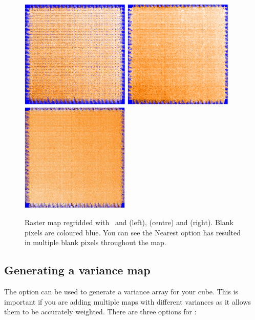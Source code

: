 \documentclass[11pt,oneside,chapters]{starlink}
\begin{document}
\begin{figure}[h!]
\begin{center}
\includegraphics[width=5.2cm, height=5.2cm]{sc20_nearest}
\includegraphics[width=5.2cm, height=5.2cm]{sc20_gauss}
\includegraphics[width=5.2cm, height=5.2cm]{sc20_sincsinc}
\caption[Options for the \makecube\ parameter `spread']{\label{fig:spread}
  Raster map regridded with \makecube\ and 
  (left),  (centre) and  (right). Blank
  pixels are coloured blue. You can see the Nearest option has
  resulted in multiple blank pixels throughout the map.}
\end{center}
\end{figure}


\subsection{Generating a variance map}

The option  can be used to generate a variance array for
your cube. This is important if you are adding multiple maps with
different variances as it allows them to be accurately weighted. There
are three options for :
\end{document}
